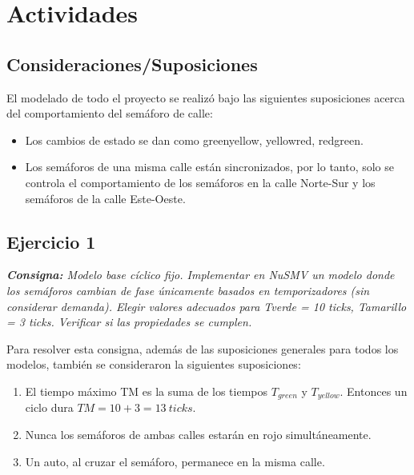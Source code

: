 \chapter*{Actividades}

\section*{Consideraciones/Suposiciones}

El modelado de todo el proyecto se realizó bajo las siguientes suposiciones acerca del comportamiento del semáforo de calle:
\begin{itemize}
    \item Los cambios de estado se dan como greenyellow, yellowred, redgreen.
    \item Los semáforos de una misma calle están sincronizados, por lo tanto, solo se controla el comportamiento de los semáforos en la calle Norte-Sur y los semáforos de la calle Este-Oeste.
\end{itemize}



\section*{Ejercicio 1}
\textit{\textbf{Consigna:} Modelo base cíclico fijo. Implementar en NuSMV un modelo donde los semáforos cambian de fase únicamente basados en temporizadores (sin considerar demanda). Elegir valores adecuados para Tverde = 10 ticks, Tamarillo = 3 ticks. Verificar si las propiedades se cumplen.}

Para resolver esta consigna, además de las suposiciones generales para todos los modelos, también se consideraron la siguientes suposiciones:
\begin{enumerate}
    \item El tiempo máximo TM es la suma de los tiempos $T_{green}$ y $T_{yellow}$. Entonces un ciclo dura $TM = 10+3 = 13\ ticks$.
    \item Nunca los semáforos de ambas calles estarán en rojo simultáneamente.
    \item Un auto, al cruzar el semáforo, permanece en la misma calle.
\end{enumerate}

